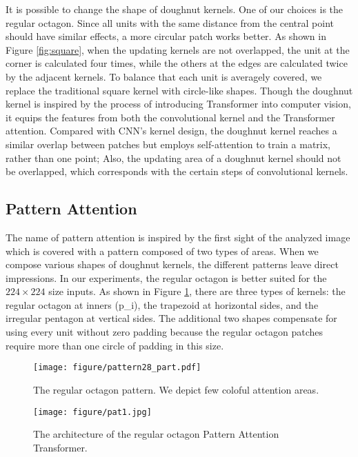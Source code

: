 \documentclass{article}
\theoremstyle{plain}
\theoremstyle{definition}
\theoremstyle{remark}
\begin{document}
It is possible to change the shape of doughnut kernels. One of our choices is the regular octagon. Since all units with the same distance from the central point should have similar effects, a more circular patch works better. As shown in Figure \ref{fig:square}, when the updating kernels are not overlapped, the unit at the corner is calculated four times, while the others at the edges are calculated twice by the adjacent kernels. To balance that each unit is averagely covered, we replace the traditional square kernel with circle-like shapes. 
Though the doughnut kernel is inspired by the process of introducing Transformer into computer vision, it equips the features from both the convolutional kernel and the Transformer attention. Compared with CNN’s kernel design, the doughnut kernel reaches a similar overlap between patches but employs self-attention to train a matrix, rather than one point; Also, the updating area of a doughnut kernel should not be overlapped, which corresponds with the certain steps of convolutional kernels.

\subsection{Pattern Attention}
The name of pattern attention is inspired by the first sight of the analyzed image which is covered with a pattern composed of two types of areas. When we compose various shapes of doughnut kernels, the different patterns leave direct impressions. In our experiments, the regular octagon is better suited for the $224\times224$ size inputs. As shown in Figure \ref{fig:pattern28part}, there are three types of kernels: the regular octagon at inners (p\_i), the trapezoid at horizontal sides, and the irregular pentagon at vertical sides. The additional two shapes compensate for using every unit without zero padding because the regular octagon patches require more than one circle of padding in this size.

\begin{figure}[h]
\centering
    \texttt{[image: figure/pattern28\_part.pdf]}
\caption{The regular octagon pattern. We depict few coloful attention areas.}
\label{fig:pattern28part}
\end{figure}

\begin{figure*}[ht]
\vskip 0.15in
\centering
    \texttt{[image: figure/pat1.jpg]}
\caption{The architecture of the regular octagon Pattern Attention Transformer.}
\label{fig:pat1}
\vskip 0.1in
\end{figure*}
\end{document}
